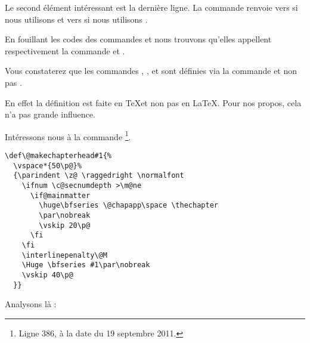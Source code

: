 Le second élément intéressant est la dernière ligne. La commande  renvoie vers  si nous utilisons  et vers  si nous utilisons .

En fouillant les codes des commandes  et  nous trouvons qu'elles appellent respectivement la commande  et .

\begin{plusloins}
Vous constaterez que les commandes , ,  et  sont définies via la commande  et non pas . 

En effet la définition est faite en \TeX et non pas en \LaTeX. Pour nos propos, cela n'a pas grande influence.
\end{plusloins} 

Intéressons nous à la commande \footnote{Ligne 386, à la date du 19 septembre 2011.}.

\begin{verbatim}
\def\@makechapterhead#1{%
  \vspace*{50\p@}%
  {\parindent \z@ \raggedright \normalfont
    \ifnum \c@secnumdepth >\m@ne
      \if@mainmatter
        \huge\bfseries \@chapapp\space \thechapter
        \par\nobreak
        \vskip 20\p@
      \fi
    \fi
    \interlinepenalty\@M
    \Huge \bfseries #1\par\nobreak
    \vskip 40\p@
  }}
\end{verbatim}

Analysons là :

